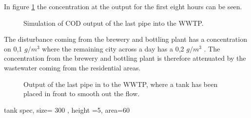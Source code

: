 In figure \ref{fig:simulation_output_first_concentration} the concentration at the output for the first eight hours can be seen.

\begin{figure}[H]
\centering

\caption{Simulation of COD output of the last pipe into the WWTP.}
\label{fig:simulation_output_first_concentration}
\end{figure}  

The disturbance coming from the brewery and bottling plant has a concentration on 0,1 $g/m^3$ where the remaining city across a day has a 0,2 $g/m^3$ . The concentration from the brewery and bottling plant is therefore attenuated by the wastewater coming from the residential areas. 



\begin{figure}[H]
\centering

\caption{Output of the last pipe in to the WWTP, where a tank has been placed in front to smooth out the flow.}
\label{fig:simulation_output_second}
\end{figure} 

tank spec, size=  300 , height =5,	area=60
			   